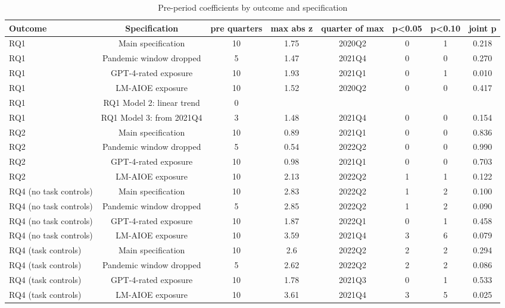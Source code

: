 \begin{table}[htbp]\centering
\caption{Pre-period coefficients by outcome and specification}
\begin{tabular}{lccccccc}
\toprule
Outcome & Specification & pre quarters & max abs z & quarter of max & p<0.05 & p<0.10 & joint p \\
\midrule
RQ1 & Main specification & 10 & 1.75 & 2020Q2 & 0 & 1 & 0.218 \\
RQ1 & Pandemic window dropped & 5 & 1.47 & 2021Q4 & 0 & 0 & 0.270 \\
RQ1 & GPT-4-rated exposure & 10 & 1.93 & 2021Q1 & 0 & 1 & 0.010 \\
RQ1 & LM-AIOE exposure & 10 & 1.52 & 2020Q2 & 0 & 0 & 0.417 \\
RQ1 & RQ1 Model 2: linear trend & 0 &  &  &  &  &  \\
RQ1 & RQ1 Model 3: from 2021Q4 & 3 & 1.48 & 2021Q4 & 0 & 0 & 0.154 \\
RQ2 & Main specification & 10 & 0.89 & 2021Q1 & 0 & 0 & 0.836 \\
RQ2 & Pandemic window dropped & 5 & 0.54 & 2022Q2 & 0 & 0 & 0.990 \\
RQ2 & GPT-4-rated exposure & 10 & 0.98 & 2021Q1 & 0 & 0 & 0.703 \\
RQ2 & LM-AIOE exposure & 10 & 2.13 & 2022Q2 & 1 & 1 & 0.122 \\
RQ4 (no task controls) & Main specification & 10 & 2.83 & 2022Q2 & 1 & 2 & 0.100 \\
RQ4 (no task controls) & Pandemic window dropped & 5 & 2.85 & 2022Q2 & 1 & 2 & 0.090 \\
RQ4 (no task controls) & GPT-4-rated exposure & 10 & 1.87 & 2022Q1 & 0 & 1 & 0.458 \\
RQ4 (no task controls) & LM-AIOE exposure & 10 & 3.59 & 2021Q4 & 3 & 6 & 0.079 \\
RQ4 (task controls) & Main specification & 10 & 2.6 & 2022Q2 & 2 & 2 & 0.294 \\
RQ4 (task controls) & Pandemic window dropped & 5 & 2.62 & 2022Q2 & 2 & 2 & 0.086 \\
RQ4 (task controls) & GPT-4-rated exposure & 10 & 1.78 & 2021Q3 & 0 & 1 & 0.533 \\
RQ4 (task controls) & LM-AIOE exposure & 10 & 3.61 & 2021Q4 & 3 & 5 & 0.025 \\
\bottomrule
\end{tabular}
\par\vspace{2pt}{\footnotesize Counts of individually significant pre-period coefficients, the largest $|$estimate/SE$|$, and the p-value of the joint Wald test that all pre-period coefficients are zero (clustered covariance; blank for runs made before step 07 saved it).}
\end{table}
